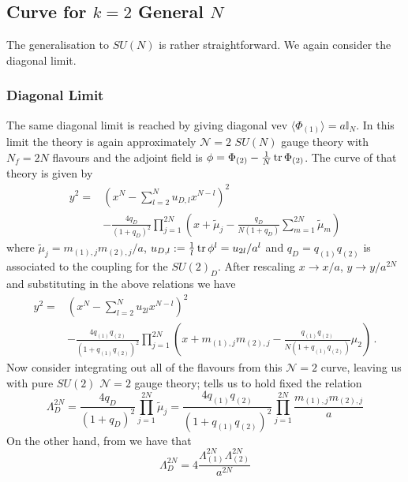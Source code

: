 \documentclass[main.tex]{subfiles}
\begin{document}
\subsection{Curve for \texorpdfstring{$k=2$}{k=2} General \texorpdfstring{$N$}{N}}
The generalisation to $SU(N)$ is rather straightforward. We again consider the diagonal limit.
\subsubsection{Diagonal Limit} The same diagonal limit is reached by giving diagonal vev $\langle\Phi_{(1)}\rangle=a\mathbb{I}_N$. In this limit the theory is again approximately $\mathcal{N}=2$ $SU(N)$ gauge theory with $N_f=2N$ flavours and the adjoint field is $\phi=\Phi_{(2)}-\frac{1}{N}\operatorname{tr}\Phi_{(2)}$. The curve of that theory is given by \cite{Argyres:1995wt}
\begin{equation}
\begin{aligned}
y^2=&\left(x^N-\sum_{l=2}^Nu_{D,l}x^{N-l}\right)^2\\
&-\frac{4q_D}{(1+q_D)^2}\prod_{j=1}^{2N}\left(x+\tilde{\mu}_j-\frac{q_D}{N(1+q_D)}\sum_{m=1}^{2N}\tilde{\mu}_m\right)
\end{aligned}
\end{equation}
where $\tilde{\mu}_j=m_{(1),j}m_{(2),j}/a$, $u_{D,l}:=\frac{1}{l}\operatorname{tr}\phi^l=u_{2l}/a^l$ and $q_{D}=q_{(1)}q_{(2)}$ is associated to the coupling for the $SU(2)_D$. 
After rescaling $x\to x/a$, $y\to y/{a^{2N}}$ and substituting in the above relations we have
\begin{equation}
\begin{aligned}
y^2=&\left(x^{N}-\sum_{l=2}^Nu_{2l}x^{N-l}\right)^2\\
&-\frac{4q_{(1)}q_{(2)}}{(1+q_{(1)}q_{(2)})^2}\prod_{j=1}^{2N}\left(x+m_{(1),j}m_{(2),j}-\frac{q_{(1)}q_{(2)}}{N(1+q_{(1)}q_{(2)})}\mu_2\right)\,.
\end{aligned}
\end{equation}
Now consider integrating out all of the flavours from this $\mathcal{N}=2$ curve, leaving us with pure $SU(2)$ $\mathcal{N}=2$ gauge theory; \cite{Argyres:1995wt} tells us to hold fixed the relation
\begin{equation}
\Lambda^{2N}_{D}=\frac{4q_{D}}{(1+q_{D})^2}\prod_{j=1}^{2N}\tilde{\mu}_j=\frac{4q_{(1)}q_{(2)}}{(1+q_{(1)}q_{(2)})^2}\prod_{j=1}^{2N}\frac{m_{(1),j}m_{(2),j}}{a}
\end{equation}
On the other hand, from \cite{Csaki:1997zg} we have that 
\begin{equation}
\Lambda_{D}^{2N}=4\frac{\Lambda^{2N}_{(1)}\Lambda^{2N}_{(2)}}{a^{2N}}
\end{equation}
\end{document}
